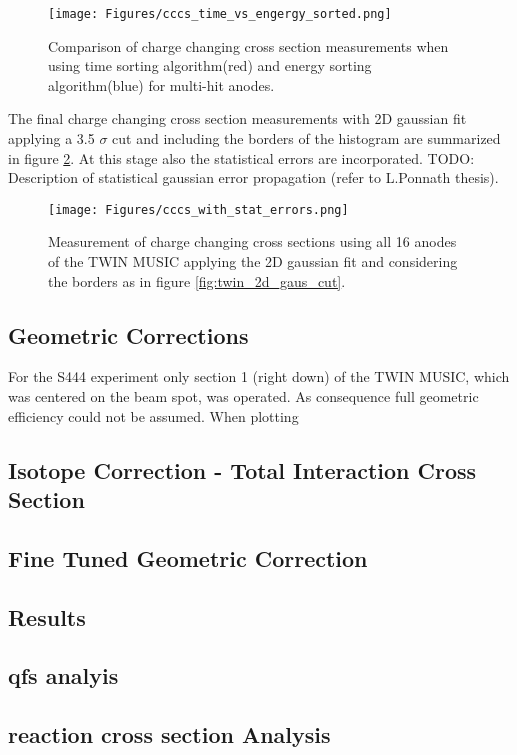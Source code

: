 \begin{figure}[htpb]
    \centering
    \texttt{[image: Figures/cccs\_time\_vs\_engergy\_sorted.png]}
    \caption{
    Comparison of charge changing cross section measurements when using time sorting algorithm(red) and energy sorting algorithm(blue) for multi-hit anodes.
     }
    \label{fig:cccs_gaus_time_vs_energy}
\end{figure}
The final charge changing cross section measurements with 2D gaussian fit applying a 3.5 $\sigma$ cut and including the borders of the histogram are summarized in figure \ref{fig:cccs_gaus_with_errors}. At this stage also the statistical errors are incorporated. 
TODO: Description of statistical gaussian error propagation (refer to L.Ponnath thesis).
\begin{figure}[htpb]
    \centering
    \texttt{[image: Figures/cccs\_with\_stat\_errors.png]}
    \caption{
    Measurement of charge changing cross sections using all 16 anodes of the TWIN MUSIC applying the 2D gaussian fit and considering the borders as in figure \ref{fig:twin_2d_gaus_cut}.
     }
    \label{fig:cccs_gaus_with_errors}
\end{figure}


%	
\subsection{Geometric Corrections}
For the S444 experiment only section 1 (right down) of the TWIN MUSIC, which was centered on the beam spot, was operated. As consequence full geometric efficiency could not be assumed. When plotting
\subsection{Isotope Correction - Total Interaction Cross Section}
\subsection{Fine Tuned Geometric Correction}
\subsection{Results}
\subsection{qfs analyis}
\subsection{reaction cross section Analysis}

